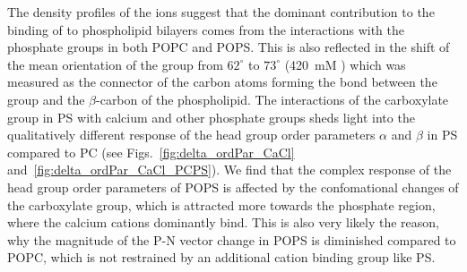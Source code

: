 The density profiles of the ions suggest that
the dominant contribution to the binding of  to phospholipid bilayers
comes from the interactions with the phosphate groups in both POPC and POPS. 
This is also reflected in the shift of the mean orientation 
of the  group from $62^\circ$ to $73^\circ$ (420~mM )
which was measured as the connector of the carbon atoms 
forming the bond between the group and the $\beta$-carbon of the phospholipid. 
The interactions of the carboxylate group in PS with calcium and other phosphate groups
sheds light into the qualitatively different response of the head group order parameters $\alpha$ and $\beta$ in PS compared to PC 
(see Figs.~\ref{fig:delta_ordPar_CaCl} and~\ref{fig:delta_ordPar_CaCl_PCPS}). 
We find that the complex response of the head group order parameters of POPS 
is affected by the confomational changes of the carboxylate group,
which is attracted more towards the phosphate region, 
where the calcium cations dominantly bind. 
This is also very likely the reason, 
why the magnitude of the P-N vector change in POPS is diminished compared to POPC, 
which is not restrained by an additional cation binding group like PS.  


